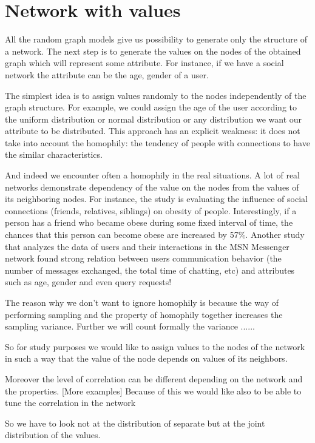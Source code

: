 \documentclass[12pt]{report}
\begin{document}
\section{Network with values}


All the random graph models give us possibility to generate only the structure of a network. The next step is to generate the values on the nodes of the obtained graph which will represent some attribute. For instance, if we have a social network the attribute can be the age, gender of a user.  

The simplest idea is to assign values randomly to the nodes independently of the graph structure. For example, we could assign the age of the user according to the uniform distribution or normal distribution or any distribution we want our attribute to be distributed. This approach has an explicit weakness: it does not take into account the homophily: the tendency of people with connections to have the similar characteristics.

And indeed we encounter often a homophily in the real situations. A lot of real networks demonstrate dependency of the value on the nodes from the values of its neighboring nodes. For instance, the study \cite{christakis2007spread} is evaluating the influence of social connections (friends, relatives, siblings) on obesity of people. Interestingly, if a person has a friend who became obese during some fixed interval of time, the chances that this person can become obese are increased by 57\%. Another study \cite{singla2008yes} that analyzes the data of users and their interactions in the MSN Messenger network found strong relation between users communication behavior (the number of messages exchanged, the total time of chatting, etc) and attributes such as age, gender and even query requests! 

The reason why we don't want to ignore homophily is because the way of performing sampling and the property of homophily together increases the sampling variance. Further we will count formally the variance ......

So for study purposes we would like to assign values to the nodes of the network in such a way that the value of the node depends on values of its neighbors.

Moreover the level of correlation can be different depending on the network and the properties. [More examples]  
Because of this we would like also to be able to tune the correlation in the network

So we have to look not at the distribution of separate but at the joint distribution of the values. 
 
\end{document}
